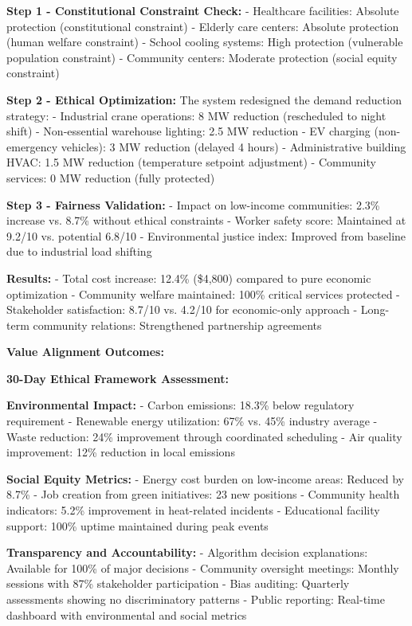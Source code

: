 \documentclass{article}
\begin{document}
\textbf{Step 1 - Constitutional Constraint Check:}
- Healthcare facilities: Absolute protection (constitutional constraint)
- Elderly care centers: Absolute protection (human welfare constraint)
- School cooling systems: High protection (vulnerable population constraint)
- Community centers: Moderate protection (social equity constraint)

\textbf{Step 2 - Ethical Optimization:}
The system redesigned the demand reduction strategy:
- Industrial crane operations: 8 MW reduction (rescheduled to night shift)
- Non-essential warehouse lighting: 2.5 MW reduction
- EV charging (non-emergency vehicles): 3 MW reduction (delayed 4 hours)
- Administrative building HVAC: 1.5 MW reduction (temperature setpoint adjustment)
- Community services: 0 MW reduction (fully protected)

\textbf{Step 3 - Fairness Validation:}
- Impact on low-income communities: 2.3\% increase vs. 8.7\% without ethical constraints
- Worker safety score: Maintained at 9.2/10 vs. potential 6.8/10
- Environmental justice index: Improved from baseline due to industrial load shifting

\textbf{Results:}
- Total cost increase: 12.4\% (\$4,800) compared to pure economic optimization
- Community welfare maintained: 100\% critical services protected
- Stakeholder satisfaction: 8.7/10 vs. 4.2/10 for economic-only approach
- Long-term community relations: Strengthened partnership agreements

\textbf{Value Alignment Outcomes:}

\textbf{30-Day Ethical Framework Assessment:}

\textbf{Environmental Impact:}
- Carbon emissions: 18.3\% below regulatory requirement
- Renewable energy utilization: 67\% vs. 45\% industry average
- Waste reduction: 24\% improvement through coordinated scheduling
- Air quality improvement: 12\% reduction in local emissions

\textbf{Social Equity Metrics:}
- Energy cost burden on low-income areas: Reduced by 8.7\%
- Job creation from green initiatives: 23 new positions
- Community health indicators: 5.2\% improvement in heat-related incidents
- Educational facility support: 100\% uptime maintained during peak events

\textbf{Transparency and Accountability:}
- Algorithm decision explanations: Available for 100\% of major decisions
- Community oversight meetings: Monthly sessions with 87\% stakeholder participation
- Bias auditing: Quarterly assessments showing no discriminatory patterns
- Public reporting: Real-time dashboard with environmental and social metrics
\end{document}
